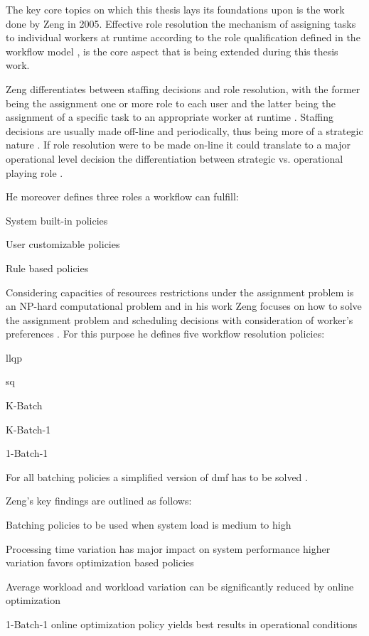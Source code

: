 \documentclass{seal_thesis}
\begin{document}
The key core topics on which this thesis lays its foundations upon is the work done by Zeng in 2005. Effective role resolution \ie the mechanism of assigning tasks to individual workers at runtime according to the role qualification defined in the workflow model \cite{Zeng2005}, is the core aspect that is being extended during this thesis work.

Zeng differentiates between staffing decisions and role resolution, with the former being the assignment one or more role to each user and the latter being the assignment of a specific task to an appropriate worker at runtime \cite{Zeng2005}. Staffing decisions are usually made off-line and periodically, thus being more of a strategic nature \cite{Zeng2005}. If role resolution were to be made on-line it could translate to a major operational level decision \ie the differentiation between strategic vs. operational playing role \cite{Zeng2005}.

He moreover defines three roles a workflow can fulfill:
\begin{enumerate*}
	\item System built-in policies
	\item User customizable policies
	\item Rule based policies
\end{enumerate*}

Considering capacities of resources restrictions under the assignment problem is an NP-hard computational problem and in his work Zeng focuses on how to solve the assignment problem and scheduling decisions with consideration of worker's preferences \cite{Zeng2005}. For this purpose he defines five workflow resolution policies:
\begin{enumerate*}
	\item \gls{llqp}
	\item \gls{sq}
	\item K-Batch
	\item K-Batch-1
	\item 1-Batch-1
\end{enumerate*}

For all batching policies a simplified version of \gls{dmf} has to be solved \cite{Zeng2005}.

Zeng's key findings are outlined as follows:
\begin{enumerate*}
	\item Batching policies to be used when system load is medium to high
	\item Processing time variation has major impact on system performance \ie higher variation favors optimization based policies
	\item Average workload and workload variation can be significantly reduced by online optimization
	\item 1-Batch-1 online optimization policy yields best results in operational conditions
\end{enumerate*}
\end{document}
